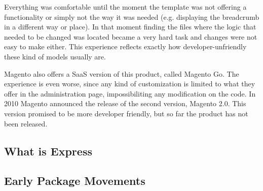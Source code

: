 Everything was comfortable until the moment the template was not offering a functionality or simply not the way it was needed (e.g. displaying the breadcrumb in a different way or place). In that moment finding the files where the logic that needed to be changed was located became a very hard task and changes were not easy to make either. This experience reflects exactly how developer-unfriendly these kind of models usually are.

Magento also offers a SaaS version of this product, called Magento Go. The experience is even worse, since any kind of customization is limited to what they offer in the administration page, impossibiliting any modification on the code. In 2010 Magento announced the release of the second version, Magento 2.0. This version promised to be more developer friendly, but so far the product has not been released. 


\subsection{What is Express}
\subsection{Early Package Movements}
